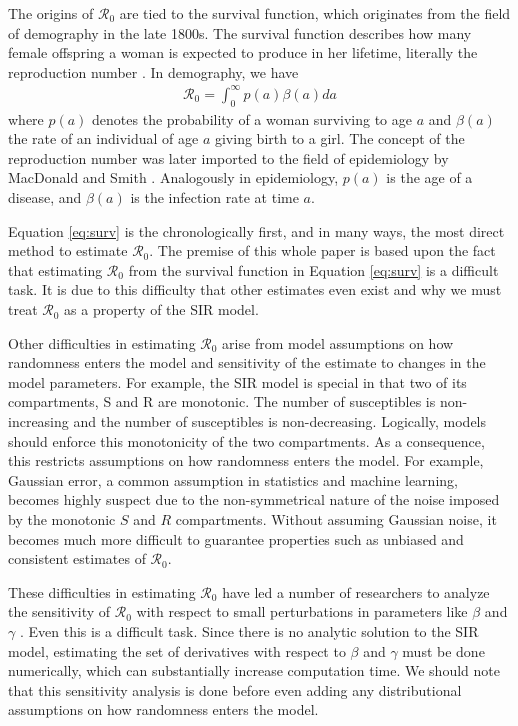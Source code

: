\documentclass[12pt]{article}
\newcommand{\rr}{\ensuremath{\mathcal{R}_0}}
\begin{document}
The origins of $\rr$ are tied to the survival function, which originates from the field of demography in the late 1800s.  The survival function describes how many female offspring a woman is expected to produce in her lifetime, literally the reproduction number \citep{dietz1993estimation}.  In demography, we have
\begin{align}\label{eq:surv}
\rr = \int_0^\infty p(a) \beta(a) da
\end{align}
where $p(a)$ denotes the probability of a woman surviving to age $a$ and $\beta(a)$ the rate of an individual of age $a$ giving birth to a  girl.  The concept of the reproduction number was later imported to the field of epidemiology by MacDonald and Smith \citep{dietz1993estimation}.  Analogously in epidemiology, $p(a)$ is the age of a disease, and $\beta(a)$ is the infection rate at time $a$.

Equation \ref{eq:surv} is the chronologically first, and in many ways, the most direct method to estimate $\rr$.  The premise of this whole paper is based upon the fact that estimating $\rr$ from the survival function in Equation \eqref{eq:surv} is a difficult task.  It is due to this difficulty that other estimates even exist and why we must treat $\rr$ as a property of the SIR model.

Other difficulties in estimating $\rr$ arise from model assumptions on how randomness enters the model and sensitivity of the estimate to changes in the model parameters.  For example, the SIR model is special in that two of its compartments, S and R are monotonic.  The number of susceptibles is non-increasing and the number of susceptibles is non-decreasing.  Logically, models should enforce this monotonicity of the two compartments.  As a consequence, this restricts assumptions on how randomness enters the model.  For example, Gaussian error, a common assumption in statistics and machine learning, becomes highly suspect due to the non-symmetrical nature of the noise imposed by the monotonic $S$ and $R$ compartments.  Without assuming Gaussian noise, it becomes much more difficult to guarantee properties such as unbiased and consistent estimates of $\rr$.

These difficulties in estimating $\rr$ have led a number of researchers to analyze the sensitivity of $\rr$ with respect to small perturbations in parameters like $\beta$ and $\gamma$ \citep{lash2003,epstein2007agent,capaldi2012}.  Even this is a difficult task. Since there is no analytic solution to the SIR model, estimating the set of derivatives with respect to $\beta$ and $\gamma$ must be done numerically, which can substantially increase computation time.  We should note that this sensitivity analysis is done before even adding any distributional assumptions on how randomness enters the model.
\end{document}
